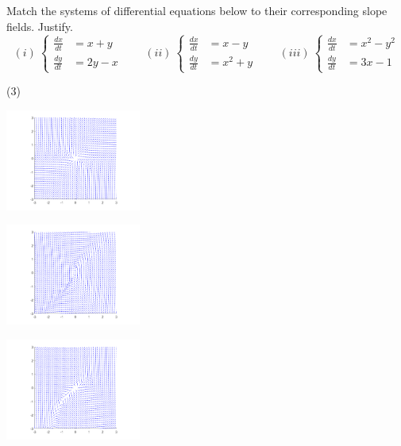 \begin{exercise}\ansMark%
Match the systems of differential equations below to their corresponding slope fields. Justify.
\begin{equation*}
(i)\ \begin{cases} \frac{dx}{dt} &= x+y \\ \frac{dy}{dt} &= 2y-x \end{cases} \qquad (ii)\ \begin{cases} \frac{dx}{dt} &= x-y \\ \frac{dy}{dt} &= x^2 + y \end{cases} \qquad (iii)\ \begin{cases} \frac{dx}{dt} &= x^2 - y^2 \\ \frac{dy}{dt} &= 3x-1 \end{cases}
\end{equation*}
\begin{tasks}(3)
\task
\parbox[c]{2in}{\includegraphics[width=1.75in]{Images/sysslopeEx1_1}}
\task
\parbox[c]{2in}{\includegraphics[width=1.75in]{Images/sysslopeEx1_3}}
\task
\parbox[c]{2in}{\includegraphics[width=1.75in]{Images/sysslopeEx1_2}}
\end{tasks}
\end{exercise}


